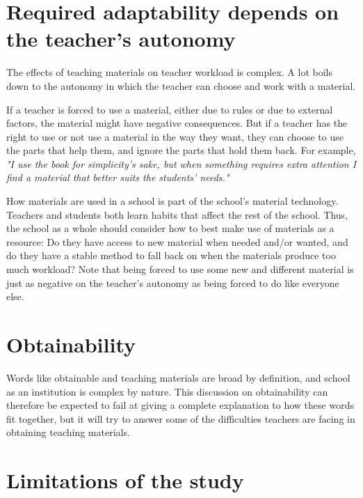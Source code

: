 \section{Required adaptability depends on the teacher's autonomy}
The effects of teaching materials on teacher workload is complex. A lot boils down to the autonomy in which the teacher can choose and work with a material.

If a teacher is forced to use a material, either due to rules or due to external factors, the material might have negative consequences. But if a teacher has the right to use or not use a material in the way they want, they can choose to use the parts that help them, and ignore the parts that hold them back. For example, \textit{"I use the book for simplicity's sake, but when something requires extra attention I find a material that better suits the students' needs."}

How materials are used in a school is part of the school's material technology. Teachers and students both learn habits that affect the rest of the school. Thus, the school as a whole should consider how to best make use of materials as a resource: Do they have access to new material when needed and/or wanted, and do they have a stable method to fall back on when the materials produce too much workload? Note that being forced to use some new and different material is just as negative on the teacher's autonomy as being forced to do like everyone else.

\section{Obtainability}
Words like obtainable and teaching materials are broad by definition, and school as an institution is complex by nature. This discussion on obtainability can therefore be expected to fail at giving a complete explanation to how these words fit together, but it will try to answer some of the difficulties teachers are facing in obtaining teaching materials.

\section{Limitations of the study}
